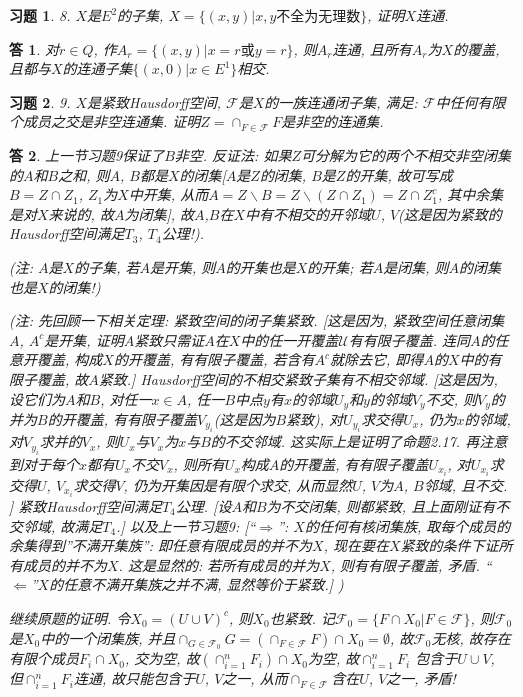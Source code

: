 \documentclass{ctexart}%
\newtheorem*{exercise}{习题}
\newtheorem*{solution}{答}
\theoremstyle{definition}
\theoremstyle{remark}
\begin{document}
\begin{exercise}8. $X$是$E^2$的子集, $X=\{(x,y)|x, y\text{不全为无理数}\}$, 证明$X$连通.
\end{exercise}
\begin{solution}对$r\in Q$, 作$A_r=\{(x,y)|x=r\text{或}y=r\}$, 则$A_r$连通, 且所有$A_r$为$X$的覆盖, 且都与$X$的连通子集$\{(x,0)|x\in E^1\}$相交.
\end{solution}

\begin{exercise}9. $X$是紧致Hausdorff空间, $\mathscr{F}$是$X$的一族连通闭子集, 满足: $\mathscr{F}$中任何有限个成员之交是非空连通集. 证明$Z=\cap_{F\in \mathscr{F}} F$是非空的连通集.
\end{exercise}
\begin{solution}
上一节习题9保证了$B$非空. 反证法: 如果$Z$可分解为它的两个不相交非空闭集的$A$和$B$之和, 则$A$, $B$都是$X$的闭集[$A$是$Z$的闭集, $B$是$Z$的开集, 故可写成$B=Z\cap Z_1$, $Z_1$为$X$中开集, 从而$A=Z\backslash B
=Z\backslash (Z\cap Z_1)=Z\cap Z_1^c$, 其中余集是对$X$来说的, 故$A$为闭集], 故$A$,$B$在$X$中有不相交的开邻域$U$, $V$(这是因为紧致的Hausdorff空间满足$T_3$, $T_4$公理!). 


(注: $A$是$X$的子集, 若$A$是开集, 则$A$的开集也是$X$的开集; 若$A$是闭集, 则$A$的闭集也是$X$的闭集!)

 (注: 先回顾一下相关定理: 紧致空间的闭子集紧致. [这是因为, 紧致空间任意闭集$A$, $A^c$是开集, 证明$A$紧致只需证$A$在$X$中的任一开覆盖$\mathscr{U}$有有限子覆盖. 连同$A$的任意开覆盖, 构成$X$的开覆盖, 有有限子覆盖, 若含有$A^c$就除去它, 即得$A$的$X$中的有限子覆盖, 故$A$紧致.] Hausdorff空间的不相交紧致子集有不相交邻域. [这是因为, 设它们为$A$和$B$, 对任一$x\in A$, 任一$B$中点$y$有$x$的邻域$U_y$和$y$的邻域$V_y$不交, 则$V_y$的并为$B$的开覆盖, 有有限子覆盖$V_{y_i}$(这是因为$B$紧致), 对$U_{y_i}$求交得$U_x$, 仍为$x$的邻域, 对$V_{y_i}$求并的$V_x$, 则$U_x$与$V_x$为$x$与$B$的不交邻域. 这实际上是证明了命题2.17. 再注意到对于每个$x$都有$U_x$不交$V_x$, 则所有$U_x$构成$A$的开覆盖, 有有限子覆盖$U_{x_i}$, 对$U_{x_i}$求交得$U$, $V_{x_i}$求交得$V$, 仍为开集因是有限个求交, 从而显然$U$, $V$为$A$, $B$邻域, 且不交. ] 
紧致Hausdorff空间满足$T_4$公理. [设$A$和$B$为不交闭集, 则都紧致, 且上面刚证有不交邻域, 故满足$T_4$.]
以及上一节习题9: [``$\Longrightarrow$'': $X$的任何有核闭集族, 取每个成员的余集得到''不满开集族'': 即任意有限成员的并不为$X$, 现在要在$X$紧致的条件下证所有成员的并不为$X$. 这是显然的: 若所有成员的并为$X$, 则有有限子覆盖, 矛盾. ``$\Longleftarrow$''$X$的任意不满开集族之并不满, 显然等价于紧致.]
)

继续原题的证明. 令$X_0=(U\cup V)^c$, 则$X_0$也紧致. 记$\mathscr{F}_0=\{F\cap X_0|F\in \mathscr{F}\}$, 则$\mathscr{F}_0$是$X_0$中的一个闭集族, 并且$\cap_{G\in \mathscr{F}_0} G =(\cap_{F\in \mathscr{F}} F) \cap X_0 = \emptyset$, 故$\mathscr{F}_0$无核, 故存在有限个成员$F_i\cap X_0$, 交为空, 故$(\cap_{i=1}^n
F_i)\cap X_0$为空, 故$\cap_{i=1}^n F_i$ 包含于$U\cup V$, 但$\cap_{i=1}^n F_i$连通, 故只能包含于$U$, $V$之一, 从而$\cap_{F\in \mathscr{F}}$含在$U$, $V$之一, 矛盾!
\end{solution}
\end{document}
